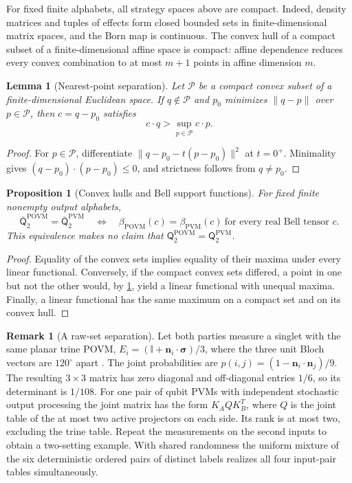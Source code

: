 \documentclass[11pt]{article}
\newtheorem{lemma}[theorem]{Lemma}
\newtheorem{proposition}[theorem]{Proposition}
\theoremstyle{definition}
\newtheorem{remark}[theorem]{Remark}
\newcommand{\id}{\mathbb I}
\newcommand{\Qset}{\mathsf Q}
\newcommand{\Qbar}{\overline{\mathsf Q}}
\newcommand{\POVM}{\mathrm{POVM}}
\newcommand{\PVM}{\mathrm{PVM}}
\newcommand{\cP}{\mathcal P}
\begin{document}
For fixed finite alphabets, all strategy spaces above are compact. Indeed,
density matrices and tuples of effects form closed bounded sets in
finite-dimensional matrix spaces, and the Born map is continuous. The convex
hull of a compact subset of a finite-dimensional affine space is compact:
affine dependence reduces every convex combination to at most \(m+1\) points
in affine dimension \(m\).

\begin{lemma}[Nearest-point separation]
\label{lem:nearest}
Let \(\cP\) be a compact convex subset of a finite-dimensional Euclidean
space. If \(q\notin\cP\) and \(p_0\) minimizes \(\|q-p\|\) over \(p\in\cP\),
then \(c=q-p_0\) satisfies
\[
c\cdot q>\sup_{p\in\cP}c\cdot p.
\]
\end{lemma}

\begin{proof}
For \(p\in\cP\), differentiate
\(\|q-p_0-t(p-p_0)\|^2\) at \(t=0^+\). Minimality gives
\((q-p_0)\cdot(p-p_0)\le0\), and strictness follows from \(q\ne p_0\).
\end{proof}

\begin{proposition}[Convex hulls and Bell support functions]
\label{prop:support-functions}
For fixed finite nonempty output alphabets,
\[
\Qbar^{\POVM}_2=\Qbar^{\PVM}_2
\quad\Longleftrightarrow\quad
\beta_{\POVM}(c)=\beta_{\PVM}(c)
\ \text{for every real Bell tensor }c.
\]
This equivalence makes no claim that
\(\Qset^{\POVM}_2=\Qset^{\PVM}_2\).
\end{proposition}

\begin{proof}
Equality of the convex sets implies equality of their maxima under every
linear functional. Conversely, if the compact convex sets differed, a point
in one but not the other would, by \cref{lem:nearest}, yield a linear
functional with unequal maxima. Finally, a linear functional has the same
maximum on a compact set and on its convex hull.
\end{proof}

\begin{remark}[A raw-set separation]
\label{rem:trine}
Let both parties measure a singlet with the same planar trine POVM,
\(E_i=(\id+\bm n_i\cdot\bm\sigma)/3\), where the three unit Bloch vectors
are \(120^\circ\) apart \cite{rout2025}. The joint probabilities are
\(p(i,j)=(1-\bm n_i\cdot\bm n_j)/9\). The resulting \(3\times3\) matrix
has zero diagonal and off-diagonal entries \(1/6\), so its determinant is
\(1/108\). For one pair of qubit PVMs with independent stochastic
output processing the joint matrix has the form \(K_A Q K_B^T\), where
\(Q\) is the joint table of the at most two active projectors on each side.
Its rank is at most two, excluding the trine table. Repeat the measurements
on the second inputs to obtain a two-setting example. With shared randomness
the uniform mixture of the six deterministic ordered pairs of distinct
labels realizes all four input-pair tables simultaneously.
\end{remark}
\end{document}
